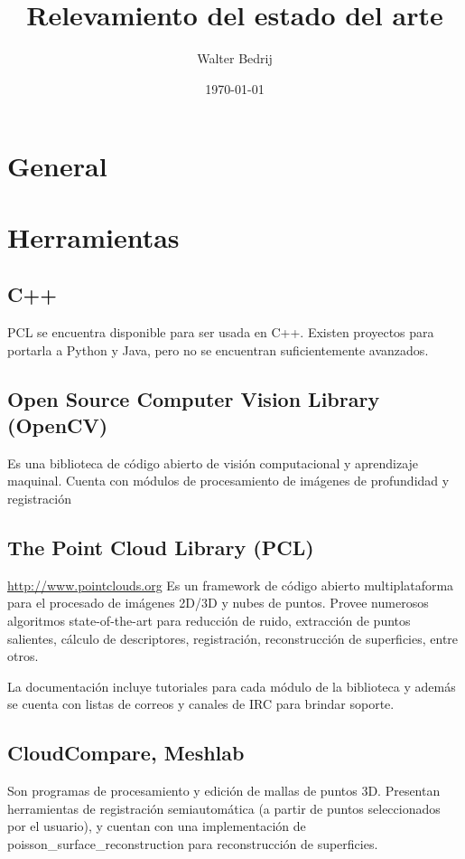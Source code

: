 \documentclass{pfc}
\title{Relevamiento del estado del arte}
\author{Walter Bedrij}
\date{\today}
\begin{document}
	\section{General}

	\section{Herramientas}
		\subsection{C++}
			PCL se encuentra disponible para ser usada en C++.
			Existen proyectos para portarla a Python y Java,
			pero no se encuentran suficientemente avanzados.
		\subsection{Open Source Computer Vision Library (OpenCV)}
			Es una biblioteca de código abierto de
			visión computacional y aprendizaje maquinal.
			Cuenta con módulos de
			procesamiento de imágenes de profundidad
			y registración


		\subsection{The Point Cloud Library (PCL)}
			\url{http://www.pointclouds.org}
			Es un framework de código abierto multiplataforma para el procesado de imágenes 2D/3D y nubes de puntos.
			Provee numerosos algoritmos state-of-the-art %
			para reducción de ruido, extracción de puntos salientes,
			cálculo de descriptores, registración,
			reconstrucción de superficies, entre otros.

			La documentación incluye tutoriales para cada módulo de la biblioteca
			y además se cuenta con listas de correos
			y canales de IRC para brindar soporte.

		\subsection{CloudCompare, Meshlab}
			Son programas de procesamiento y edición de mallas de puntos 3D.
			Presentan herramientas de registración semiautomática (a partir de
			puntos seleccionados por el usuario), y cuentan con una
			implementación de poisson_surface_reconstruction
			para reconstrucción de superficies.
\end{document}
